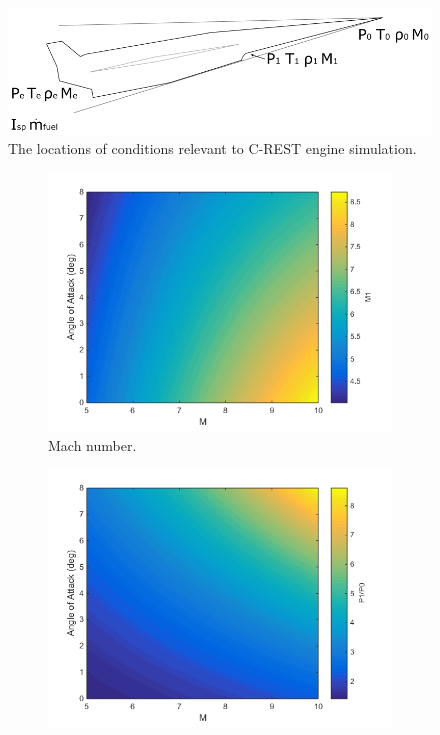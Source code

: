 \begin{figure}[ht]
\centering
\includegraphics[width=0.7\linewidth]{figures/3_vehicle_design/SPARTANEngineshock}
\caption{The locations of conditions relevant to C-REST engine simulation. }
\label{fig:SPARTANEngineshock}
\end{figure}


\begin{figure}
\begin{subfigure}{.5\textwidth}
\centering
\includegraphics[width=0.99\linewidth]{figures/3_vehicle_design/ConicalM}
\caption{Mach number.}
\label{fig:ConicalM}
\end{subfigure}
\begin{subfigure}{.5\textwidth}
\centering
\includegraphics[width=0.99\linewidth]{figures/3_vehicle_design/ConicalP}

\end{subfigure}
\end{figure}
